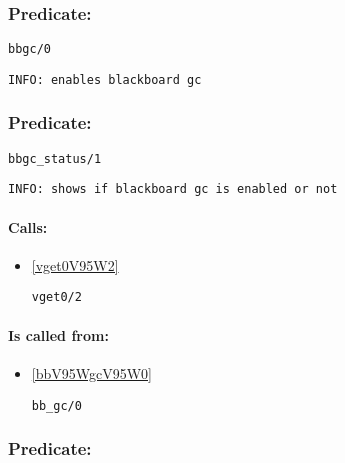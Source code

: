 \subsubsection{Predicate:} \label{bbgcV95W0}

\begin{verbatim}
bbgc/0
\end{verbatim}

{\small \begin{verbatim}
INFO: enables blackboard gc 

\end{verbatim}}

\subsubsection{Predicate:} \label{bbgcV95WstatusV95W1}

\begin{verbatim}
bbgc_status/1
\end{verbatim}

{\small \begin{verbatim}
INFO: shows if blackboard gc is enabled or not

\end{verbatim}}
\paragraph{Calls:} 
\begin{itemize}
\item \ref{vget0V95W2} 
\begin{verbatim}
vget0/2
\end{verbatim}

\end{itemize}
\paragraph{Is called from:} 
\begin{itemize}
\item \ref{bbV95WgcV95W0} 
\begin{verbatim}
bb_gc/0
\end{verbatim}

\end{itemize}

\subsubsection{Predicate:} \label{beginV95WcriticalV95W0}

